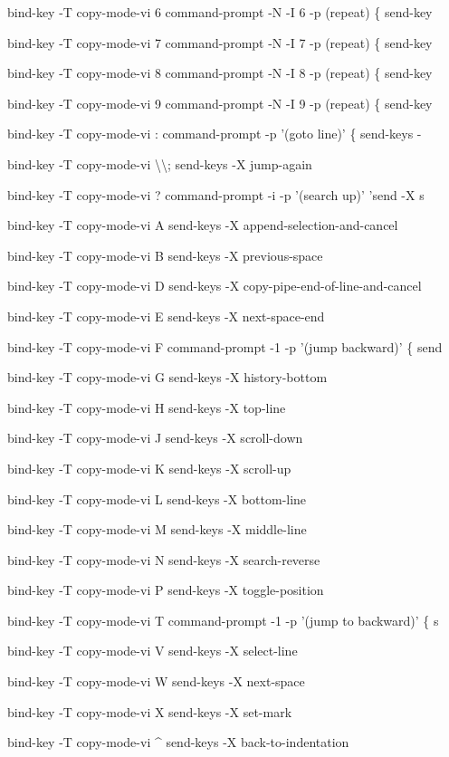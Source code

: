 \documentclass[11pt,a4paper,twoside]{book}
\begin{document}
bind-key  -T copy-mode-vi 6  command-prompt -N -I 6 -p (repeat) \{ send-key

bind-key  -T copy-mode-vi 7  command-prompt -N -I 7 -p (repeat) \{ send-key

bind-key  -T copy-mode-vi 8  command-prompt -N -I 8 -p (repeat) \{ send-key

bind-key  -T copy-mode-vi 9  command-prompt -N -I 9 -p (repeat) \{ send-key

bind-key  -T copy-mode-vi :  command-prompt -p '(goto line)' \{ send-keys -

bind-key  -T copy-mode-vi \textbackslash{}\textbackslash{};  send-keys -X jump-again

bind-key  -T copy-mode-vi ?  command-prompt -i -p '(search up)' 'send -X s

bind-key  -T copy-mode-vi A  send-keys -X append-selection-and-cancel

bind-key  -T copy-mode-vi B  send-keys -X previous-space

bind-key  -T copy-mode-vi D  send-keys -X copy-pipe-end-of-line-and-cancel

bind-key  -T copy-mode-vi E  send-keys -X next-space-end

bind-key  -T copy-mode-vi F  command-prompt -1 -p '(jump backward)' \{ send

bind-key  -T copy-mode-vi G  send-keys -X history-bottom

bind-key  -T copy-mode-vi H  send-keys -X top-line

bind-key  -T copy-mode-vi J  send-keys -X scroll-down

bind-key  -T copy-mode-vi K  send-keys -X scroll-up

bind-key  -T copy-mode-vi L  send-keys -X bottom-line

bind-key  -T copy-mode-vi M  send-keys -X middle-line

bind-key  -T copy-mode-vi N  send-keys -X search-reverse

bind-key  -T copy-mode-vi P  send-keys -X toggle-position

bind-key  -T copy-mode-vi T  command-prompt -1 -p '(jump to backward)' \{ s

bind-key  -T copy-mode-vi V  send-keys -X select-line

bind-key  -T copy-mode-vi W  send-keys -X next-space

bind-key  -T copy-mode-vi X  send-keys -X set-mark

bind-key  -T copy-mode-vi \textasciicircum{}  send-keys -X back-to-indentation
\end{document}
